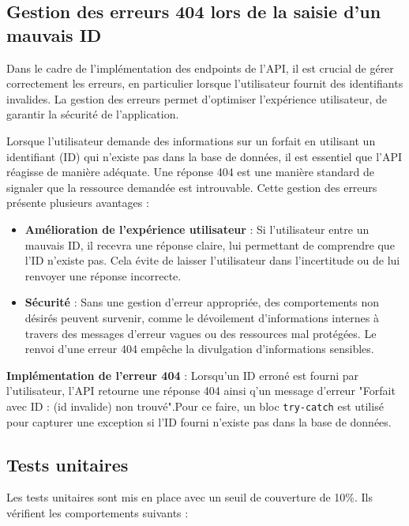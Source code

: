 \documentclass{article}
\begin{document}
	\subsection{Gestion des erreurs 404 lors de la saisie d'un mauvais ID}
	\label{subsec:error-handling}
	
	Dans le cadre de l'implémentation des endpoints de l'API, il est crucial de gérer correctement les erreurs, en particulier lorsque l'utilisateur fournit des identifiants invalides. La gestion des erreurs permet d'optimiser l'expérience utilisateur, de garantir la sécurité de l'application.
	
	Lorsque l'utilisateur demande des informations sur un forfait en utilisant un identifiant (ID) qui n'existe pas dans la base de données, il est essentiel que l'API réagisse de manière adéquate. Une réponse 404 est une manière standard de signaler que la ressource demandée est introuvable. Cette gestion des erreurs présente plusieurs avantages :
	
	\begin{itemize}
		\item \textbf{Amélioration de l'expérience utilisateur} : Si l'utilisateur entre un mauvais ID, il recevra une réponse claire, lui permettant de comprendre que l'ID n'existe pas. Cela évite de laisser l'utilisateur dans l'incertitude ou de lui renvoyer une réponse incorrecte.
		\item \textbf{Sécurité} : Sans une gestion d'erreur appropriée, des comportements non désirés peuvent survenir, comme le dévoilement d'informations internes à travers des messages d'erreur vagues ou des ressources mal protégées. Le renvoi d'une erreur 404 empêche la divulgation d'informations sensibles.
	\end{itemize}
	
	\textbf{Implémentation de l'erreur 404} : 
	Lorsqu'un ID erroné est fourni par l'utilisateur, l'API retourne une réponse 404 ainsi q'un message d'erreur "Forfait avec ID : (id invalide) non trouvé".Pour ce faire, un bloc \texttt{try-catch} est utilisé pour capturer une exception si l'ID fourni n'existe pas dans la base de données.

	
	\subsection{Tests unitaires}
	\label{subsec:tests}
	
	Les tests unitaires sont mis en place avec un seuil de couverture de 10\%. Ils vérifient les comportements suivants :
	
\end{document}

